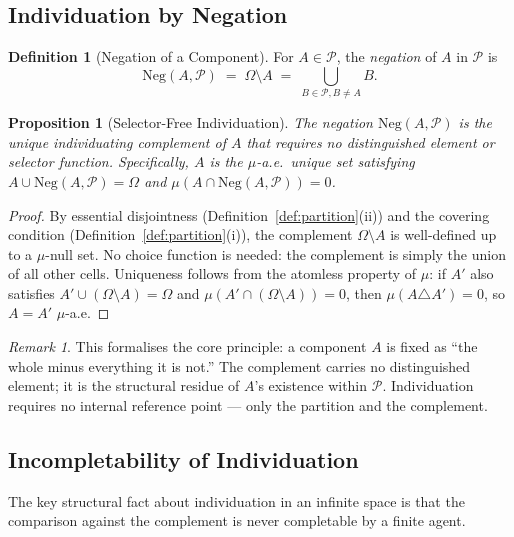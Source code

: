 \documentclass[12pt,a4paper,twocolumn]{article}
\theoremstyle{plain}
\newtheorem{proposition}[theorem]{Proposition}
\theoremstyle{definition}
\newtheorem{definition}[theorem]{Definition}
\theoremstyle{remark}
\newtheorem{remark}[theorem]{Remark}
\newcommand{\Part}{\mathcal{P}}
\newcommand{\Neg}{\mathrm{Neg}}
\begin{document}
\subsection{Individuation by Negation}

\begin{definition}[Negation of a Component]
\label{def:negation}
For $A \in \Part$, the \emph{negation} of $A$ in $\Part$ is
\begin{equation}
  \Neg(A, \Part) \;=\; \Omega \setminus A \;=\; \bigcup_{B \in \Part, B \neq A} B.
\end{equation}
\end{definition}

\begin{proposition}[Selector-Free Individuation]
\label{prop:selector-free}
The negation $\Neg(A,\Part)$ is the unique individuating complement of $A$
that requires no distinguished element or selector function.  Specifically,
$A$ is the $\mu$-a.e.\ unique set satisfying $A \cup \Neg(A,\Part) = \Omega$
and $\mu(A \cap \Neg(A,\Part)) = 0$.
\end{proposition}

\begin{proof}
By essential disjointness (Definition~\ref{def:partition}(ii)) and the
covering condition (Definition~\ref{def:partition}(i)), the complement
$\Omega \setminus A$ is well-defined up to a $\mu$-null set.  No choice
function is needed: the complement is simply the union of all other cells.
Uniqueness follows from the atomless property of $\mu$: if $A'$ also satisfies
$A' \cup (\Omega \setminus A) = \Omega$ and $\mu(A' \cap (\Omega \setminus
A)) = 0$, then $\mu(A \triangle A') = 0$, so $A = A'$ $\mu$-a.e.
\end{proof}

\begin{remark}
This formalises the core principle: a component $A$ is fixed as ``the whole
minus everything it is not.''  The complement carries no distinguished
element; it is the structural residue of $A$'s existence within $\Part$.
Individuation requires no internal reference point --- only the partition
and the complement.
\end{remark}

\subsection{Incompletability of Individuation}

The key structural fact about individuation in an infinite space is that the
comparison against the complement is never completable by a finite agent.
\end{document}
